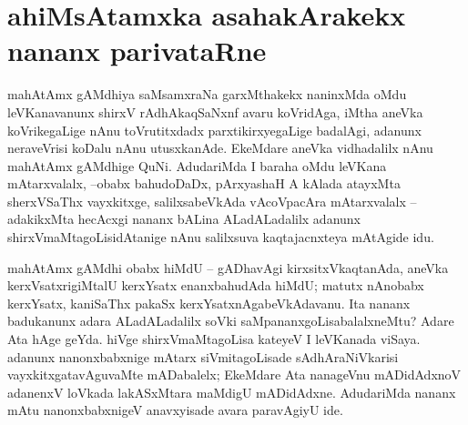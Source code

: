 \makeatletter
\def\@makechapterhead#1{%
  \vspace*{10\p@}%
{\fontsize{13pt}{13pt}\selectfont\raggedright{\bf  i. sATxnfli joVnfsx}\par}
\vspace*{25\p@}%
  {\parindent \z@ \centering \normalfont
    \ifnum \c@secnumdepth >\m@ne
      \if@mainmatter
        {\LARGE\bfseries  #1}\par\nobreak
	\vskip 4pt
      \fi
    \fi
\smallskip 

 \vskip 10\p@  
{\fontsize{12pt}{12pt}\selectfont\raggedleft{anu: \bf pu.ti.na.}\par}
  }
\vskip 40\p@}
\makeatother

\chapter{ahiMsAtamxka asahakArakekx nananx parivataRne}\label{chap1}


mahAtAmx gAMdhiya saMsamxraNa garxMthakekx naninxMda oMdu leVKanavanunx shirxV rAdhAkaqSaNxnf avaru koVridAga, iMtha aneVka koVrikegaLige nAnu toVrutitxdadx parxtikirxyegaLige badalAgi, adanunx neraveVrisi koDalu nAnu utusxkanAde. EkeMdare aneVka vidhadalilx nAnu mahAtAmx gAMdhige QuNi. AdudariMda I baraha oMdu leVKana mAtarxvalalx, --obabx bahudoDaDx, pArxyashaH A kAlada atayxMta sherxVSaThx vayxkitxge, salilxsabeVkAda vAcoVpacAra mAtarxvalalx -- adakikxMta hecAcxgi nananx bALina ALadALadalilx adanunx shirxVmaMtagoLisidAtanige nAnu salilxsuva kaqtajacnxteya mAtAgide idu.

mahAtAmx gAMdhi obabx hiMdU -- gADhavAgi kirxsitxVkaqtanAda, aneVka kerxVsatxri\-giMtalU kerxYsatx enanxbahudAda hiMdU; matutx nAnobabx kerxYsatx, kaniSaThx pakaSx kerxYsatxnAgabeVkAdavanu. Ita nananx badukanunx adara ALadALadalilx soVki saMpananxgoLisabalalxneMtu? Adare Ata hAge geYda. hiVge shirxVmaMtagoLisa kateyeV I leVKanada viSaya. adanunx nanonxbabxnige mAtarx siVmitagoLisade sAdhAraNiVkarisi vayxkitxgatavAguvaMte mADabalelx; EkeMdare Ata nanageVnu mADidAdxnoV adanenxV loVkada lakASxMtara maMdigU mADidAdxne. AdudariMda nananx mAtu nanonxbabxnigeV anavxyisade avara paravAgiyU ide. 

